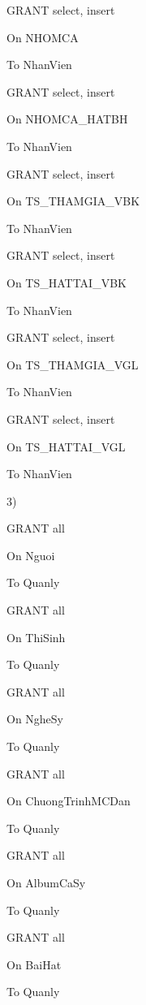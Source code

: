\documentclass{report}
\begin{document}
GRANT select, insert

On NHOMCA

To NhanVien

\bigskip

GRANT select, insert

On NHOMCA\_HATBH

To NhanVien

\bigskip

GRANT select, insert

On TS\_THAMGIA\_VBK

To NhanVien

\bigskip

GRANT select, insert

On TS\_HATTAI\_VBK

To NhanVien

\bigskip

GRANT select, insert

On TS\_THAMGIA\_VGL

To NhanVien

\bigskip

GRANT select, insert

On TS\_HATTAI\_VGL

To NhanVien

\bigskip

\setlength{\parindent}{0cm}
3)

\setlength{\parindent}{0.5cm}
GRANT all

On Nguoi 

To Quanly

\bigskip

GRANT all

On ThiSinh 

To Quanly

\bigskip

GRANT all

On NgheSy 

To Quanly

\bigskip

GRANT all

On ChuongTrinhMCDan 

To Quanly

\bigskip

GRANT all

On AlbumCaSy 

To Quanly

\bigskip

GRANT all

On BaiHat 

To Quanly
\end{document}
